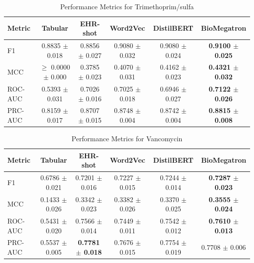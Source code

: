 \documentclass{article}
\theoremstyle{plain}
\theoremstyle{definition}
\theoremstyle{remark}
\begin{document}
\begin{table}[h!]
\caption{Performance Metrics for Trimethoprim/sulfa}
\label{table-trimethoprim-sulfa}
\vskip 0.15in
\begin{center}
\begin{small}
\begin{sc}
\begin{adjustbox}{width=5in}
\begin{tabular}{l| ccccc}
\toprule
Metric & Tabular & EHR-shot & Word2Vec & DistilBERT & BioMegatron \\
\midrule
F1 & 0.8835 $\pm$ 0.018 & 0.8856 $\pm$ 0.027 & 0.9080 $\pm$ 0.032 & 0.9080 $\pm$ 0.024 & \textbf{0.9100 $\pm$ 0.025} \\
MCC & $\geq$ 0.0000 $\pm$ 0.000 & 0.3785 $\pm$ 0.023 & 0.4070 $\pm$ 0.031 & 0.4162 $\pm$ 0.023 & \textbf{0.4321 $\pm$ 0.032} \\
ROC-AUC & 0.5393 $\pm$ 0.031 & 0.7026 $\pm$ 0.016 & 0.7025 $\pm$ 0.018 & 0.6946 $\pm$ 0.027 & \textbf{0.7122 $\pm$ 0.026} \\
PRC-AUC & 0.8159 $\pm$ 0.017 & 0.8707 $\pm$ 0.015 & 0.8748 $\pm$ 0.004 & 0.8742 $\pm$ 0.004 & \textbf{0.8815 $\pm$ 0.008} \\
\bottomrule
\end{tabular}
\end{adjustbox}
\end{sc}
\end{small}
\end{center}
\vskip -0.1in
\end{table}

\begin{table}[h!]
\caption{Performance Metrics for Vancomycin}
\label{table-vancomycin}
\vskip 0.15in
\begin{center}
\begin{small}
\begin{sc}
\begin{adjustbox}{width=5in}
\begin{tabular}{l| ccccc}
\toprule
Metric & Tabular & EHR-shot & Word2Vec & DistilBERT & BioMegatron \\
\midrule
F1 & 0.6786 $\pm$ 0.021 & 0.7201 $\pm$ 0.016 & 0.7227 $\pm$ 0.015 & 0.7244 $\pm$ 0.014 & \textbf{0.7287 $\pm$ 0.023} \\
MCC & 0.1433 $\pm$ 0.026 & 0.3342 $\pm$ 0.023 & 0.3382 $\pm$ 0.026 & 0.3370 $\pm$ 0.025 & \textbf{0.3555 $\pm$ 0.024} \\
ROC-AUC & 0.5431 $\pm$ 0.020 & 0.7566 $\pm$ 0.014 & 0.7449 $\pm$ 0.011 & 0.7542 $\pm$ 0.012 & \textbf{0.7610 $\pm$ 0.013} \\
PRC-AUC & 0.5537 $\pm$ 0.005 & \textbf{0.7781 $\pm$ 0.018} & 0.7676 $\pm$ 0.015 & 0.7754 $\pm$ 0.019 & 0.7708 $\pm$ 0.006 \\
\bottomrule
\end{tabular}
\end{adjustbox}
\end{sc}
\end{small}
\end{center}
\vskip -0.1in
\end{table}
\end{document}

